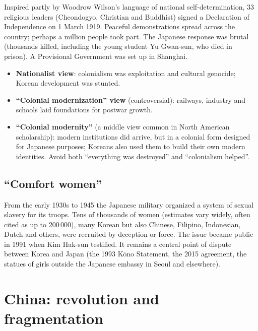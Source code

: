 Inspired partly by Woodrow Wilson's language of national self-determination, 33 religious
leaders (Cheondogyo, Christian and Buddhist) signed a Declaration of Independence on 1 March
1919. Peaceful demonstrations spread across the country; perhaps a million people took
part. The Japanese response was brutal (thousands killed, including the young student Yu
Gwan-sun, who died in prison). A Provisional Government was set up in Shanghai.

\begin{important}
\begin{itemize}
  \item \textbf{Nationalist view}: colonialism was exploitation and cultural genocide;
        Korean development was stunted.
  \item \textbf{``Colonial modernization'' view} (controversial): railways, industry and
        schools laid foundations for postwar growth.
  \item \textbf{``Colonial modernity''} (a middle view common in North American scholarship):
        modern institutions did arrive, but in a colonial form designed for Japanese
        purposes; Koreans also used them to build their own modern identities. Avoid both
        ``everything was destroyed'' and ``colonialism helped''.
\end{itemize}
\end{important}

\subsection{``Comfort women''}

From the early 1930s to 1945 the Japanese military organized a system of sexual slavery
for its troops. Tens of thousands of women (estimates vary widely, often cited as up to
200\,000), many Korean but also Chinese, Filipino, Indonesian, Dutch and others, were
recruited by deception or force. The issue became public in 1991 when Kim Hak-sun testified.
It remains a central point of dispute between Korea and Japan (the 1993 Kōno Statement, the
2015 agreement, the statues of girls outside the Japanese embassy in Seoul and elsewhere).

\section{China: revolution and fragmentation}

